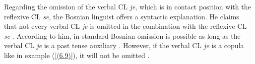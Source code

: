\begin{exe}\ex\begin{xlist}
\end{xlist}
\end{exe}

\noindent Regarding the omission of the verbal CL \textit{je}, which is in contact position with the reflexive CL \textit{se}, the Bosnian linguist \citet{Ridjanovic12} offers a syntactic explanation. He claims that not every verbal CL \textit{je} is omitted in the combination with the reflexive CL \textit{se}  \citep[cf.][564]{Ridjanovic12}. According to him, in standard Bosnian omission is possible as long as the verbal CL \textit{je} is a past tense auxiliary  \citep[cf.][564]{Ridjanovic12}. However, if the verbal CL \textit{je} is a copula like in example (\ref{(6.9)}), it will not be omitted  \citep[cf.][564]{Ridjanovic12}. %


